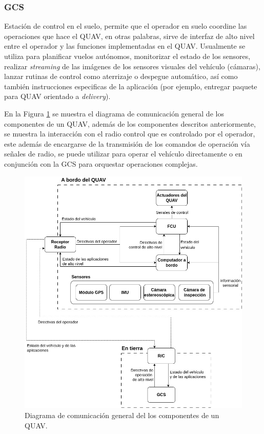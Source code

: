 \subsubsection*{GCS}

Estación de control en el suelo, permite que el operador en suelo coordine las operaciones que hace el QUAV, en otras palabras, sirve de interfaz de alto nivel entre el operador y las funciones implementadas en el QUAV. Usualmente se utiliza para planificar vuelos autónomos, monitorizar el estado de los sensores, realizar \textit{streaming} de las imágenes de los sensores visuales del vehículo (cámaras), lanzar rutinas de control como aterrizaje o despegue automático, así como también instrucciones especificas de la aplicación (por ejemplo, entregar paquete para QUAV orientado a \textit{delivery}).

En la Figura \ref{fig:QUAV-components} se muestra el diagrama de comunicación general de los componentes de un QUAV, además de los componentes descritos anteriormente, se muestra la interacción con el radio control que es controlado por el operador, este además de encargarse de la transmisión de los comandos de operación vía señales de radio, se puede utilizar para operar el vehículo directamente o en conjunción con la GCS para orquestar operaciones complejas. 

\begin{figure}[H]
    \centering
    \includegraphics[scale=0.45]{partes/img/QUAV-components.jpg}
    \caption[Diagrama de comunicación general del los componentes de un QUAV.]{Diagrama de comunicación general del los componentes de un QUAV.} 
    \label{fig:QUAV-components}
\end{figure}

